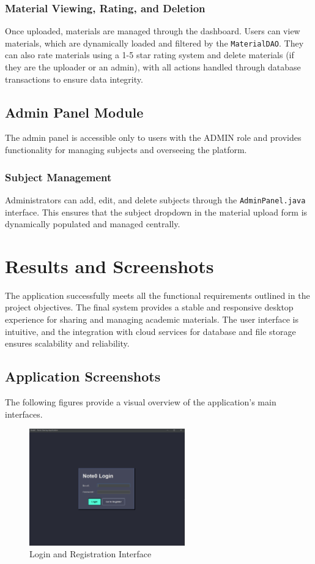 \documentclass[12pt, a4paper]{report}
\begin{document}
\subsubsection{Material Viewing, Rating, and Deletion}
Once uploaded, materials are managed through the dashboard. Users can view materials, which are dynamically loaded and filtered by the \texttt{MaterialDAO}. They can also rate materials using a 1-5 star rating system and delete materials (if they are the uploader or an admin), with all actions handled through database transactions to ensure data integrity.

\subsection{Admin Panel Module}
The admin panel is accessible only to users with the ADMIN role and provides functionality for managing subjects and overseeing the platform.

\subsubsection{Subject Management}
Administrators can add, edit, and delete subjects through the \texttt{AdminPanel.java} interface. This ensures that the subject dropdown in the material upload form is dynamically populated and managed centrally.

\section{Results and Screenshots}
The application successfully meets all the functional requirements outlined in the project objectives. The final system provides a stable and responsive desktop experience for sharing and managing academic materials. The user interface is intuitive, and the integration with cloud services for database and file storage ensures scalability and reliability.

\subsection{Application Screenshots}
The following figures provide a visual overview of the application's main interfaces.
\begin{figure}[h!]
    \centering
    \includegraphics[width=0.6\textwidth]{new_images_note/login_page.png}
    \caption{Login and Registration Interface}
    \label{fig:login_page}
\end{figure}
\end{document}
